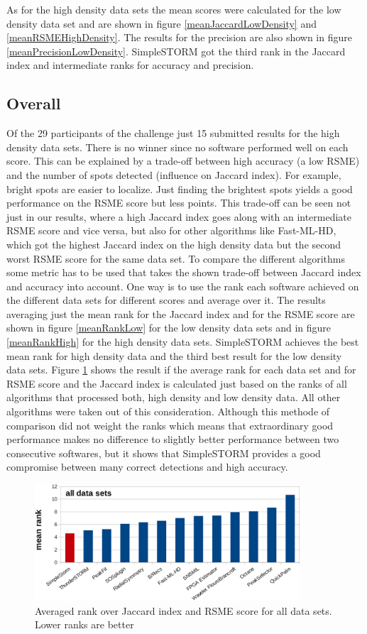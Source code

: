 As for the high density data sets the mean scores were calculated for the low density data set and are shown in figure \ref{meanJaccardLowDensity} and \ref{meanRSMEHighDensity}. The results for the precision are also shown in figure \ref{meanPrecisionLowDensity}. SimpleSTORM got the third rank in the Jaccard index and intermediate ranks for accuracy and precision.



\subsection{Overall}
Of the 29 participants of the challenge just 15 submitted results for the high density data sets. There is no winner since no software performed well on each score. This can be explained by a trade-off between high accuracy (a low RSME) and the number of spots detected (influence on Jaccard index). For example, bright spots are easier to localize. Just finding the brightest spots yields a good performance on the RSME score but less points. This trade-off can be seen not just in our results, where a high Jaccard index goes along with an intermediate RSME score and vice versa, but also for other algorithms like Fast-ML-HD, which got the highest Jaccard index on the high density data but the second worst RSME score for the same data set.\newline
To compare the different algorithms some metric has to be used that takes the shown trade-off between Jaccard index and accuracy into account. One way is to use the rank each software achieved on the different data sets for different scores and average over it. The results averaging just the mean rank for the Jaccard index and for the RSME score are shown in figure \ref{meanRankLow} for the low density data sets and in figure \ref{meanRankHigh} for the high density data sets.\newline
SimpleSTORM achieves the best mean rank for high density data and the third best result for the low density data sets. \newline
Figure \ref{meanRankOverall} shows the result if the average rank for each data set and for RSME score and the Jaccard index is calculated just based on the ranks of all algorithms that processed both, high density and low density data. All other algorithms were taken out of this consideration. Although this methode of comparison did not weight the ranks which means that extraordinary good performance makes no difference to slightly better performance between two consecutive softwares, but it shows that SimpleSTORM provides a good compromise between many correct detections and high accuracy.



\begin{figure}
\centering
\includegraphics[width = 0.88\textwidth]{pictures/diagrammsChallenge/MeanRankOverallCropped.pdf}
	\caption{Averaged rank over Jaccard index and RSME score for all data sets. Lower ranks are better}
	\label{meanRankOverall}
\end{figure}